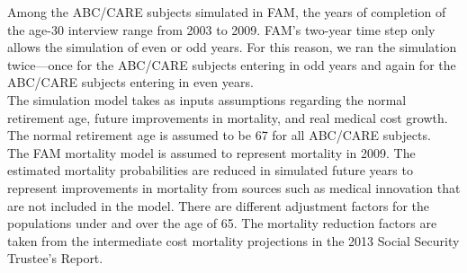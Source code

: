\noindent Among the ABC/CARE subjects simulated in FAM, the years of completion of the age-30 interview range from 2003 to 2009.
FAM's two-year time step only allows the simulation of even or odd years.
For this reason, we ran the simulation twice---once for the ABC/CARE subjects entering in odd years and again for the ABC/CARE subjects entering in even years. \\

\noindent The simulation model takes as inputs assumptions regarding the normal retirement age, future improvements in mortality, and real medical cost growth.
The normal retirement age is assumed to be 67 for all ABC/CARE subjects. \\


\noindent The FAM mortality model is assumed to represent mortality in 2009.
The estimated mortality probabilities are reduced in simulated future years to represent improvements in mortality from sources such as medical innovation that are not included in the model.
There are different adjustment factors for the populations under and over the age of 65.
The mortality reduction factors are taken from the intermediate cost mortality projections in the 2013 Social Security Trustee's Report. \\


